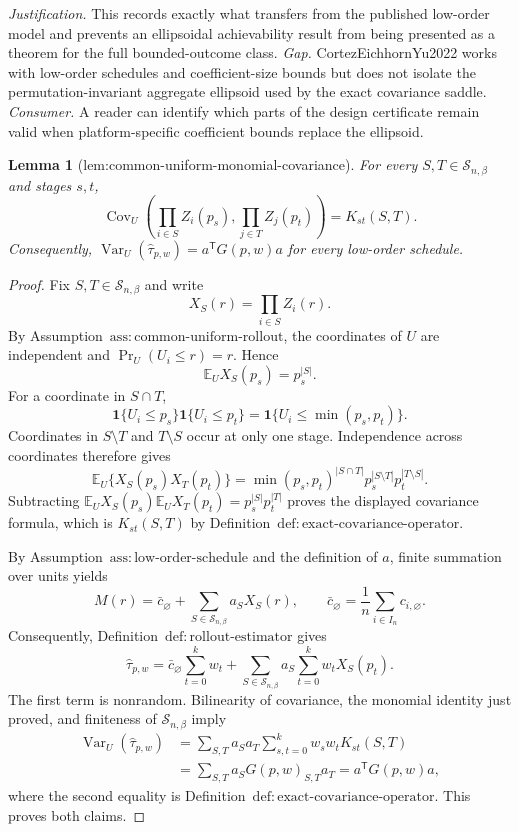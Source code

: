 \documentclass{article}
\newtheorem{lemma}{Lemma}
\begin{document}
\par\smallskip\noindent \textit{Justification.} This records exactly what transfers from the published low-order model and prevents an ellipsoidal achievability result from being presented as a theorem for the full bounded-outcome class. \textit{Gap.} CortezEichhornYu2022 works with low-order schedules and coefficient-size bounds but does not isolate the permutation-invariant aggregate ellipsoid used by the exact covariance saddle. \textit{Consumer.} A reader can identify which parts of the design certificate remain valid when platform-specific coefficient bounds replace the ellipsoid.

\begin{lemma}[lem:common-uniform-monomial-covariance]\label{lem:common-uniform-monomial-covariance}
For every \(S,T\in\mathcal S_{n,\beta}\) and stages \(s,t\), \[\operatorname{Cov}_U\!\left(\prod_{i\in S}Z_i(p_s),\prod_{j\in T}Z_j(p_t)\right)=K_{st}(S,T).\] Consequently, \(\operatorname{Var}_U(\widehat\tau_{p,w})=a^{\mathsf T}G(p,w)a\) for every low-order schedule.
\end{lemma}
\begin{proof}
Fix \(S,T\in\mathcal S_{n,\beta}\) and write
\[
X_S(r)=\prod_{i\in S}Z_i(r).
\]
By Assumption~\(\mathrm{ass{:}common\text{-}uniform\text{-}rollout}\), the coordinates of \(U\) are independent and \(\Pr_U(U_i\le r)=r\).  Hence
\[
\mathbb E_U X_S(p_s)=p_s^{|S|}.
\]
For a coordinate in \(S\cap T\),
\[
\mathbf 1\{U_i\le p_s\}\mathbf 1\{U_i\le p_t\}
=\mathbf 1\{U_i\le\min(p_s,p_t)\}.
\]
Coordinates in \(S\setminus T\) and \(T\setminus S\) occur at only one stage.  Independence across coordinates therefore gives
\[
\mathbb E_U\{X_S(p_s)X_T(p_t)\}
=\min(p_s,p_t)^{|S\cap T|}p_s^{|S\setminus T|}p_t^{|T\setminus S|}.
\]
Subtracting \(\mathbb E_U X_S(p_s)\mathbb E_U X_T(p_t)=p_s^{|S|}p_t^{|T|}\) proves the displayed covariance formula, which is \(K_{st}(S,T)\) by Definition~\(\mathrm{def{:}exact\text{-}covariance\text{-}operator}\).

By Assumption~\(\mathrm{ass{:}low\text{-}order\text{-}schedule}\) and the definition of \(a\), finite summation over units yields
\[
M(r)=\bar c_{\varnothing}+\sum_{S\in\mathcal S_{n,\beta}}a_SX_S(r),
\qquad
\bar c_{\varnothing}=\frac1n\sum_{i\in I_n}c_{i,\varnothing}.
\]
Consequently, Definition~\(\mathrm{def{:}rollout\text{-}estimator}\) gives
\[
\widehat\tau_{p,w}
=\bar c_{\varnothing}\sum_{t=0}^kw_t
+\sum_{S\in\mathcal S_{n,\beta}}a_S\sum_{t=0}^kw_tX_S(p_t).
\]
The first term is nonrandom.  Bilinearity of covariance, the monomial identity just proved, and finiteness of \(\mathcal S_{n,\beta}\) imply
\[
\begin{aligned}
\operatorname{Var}_U(\widehat\tau_{p,w})
&=\sum_{S,T}a_Sa_T\sum_{s,t=0}^kw_sw_tK_{st}(S,T)\\
&=\sum_{S,T}a_SG(p,w)_{S,T}a_T
=a^{\mathsf T}G(p,w)a,
\end{aligned}
\]
where the second equality is Definition~\(\mathrm{def{:}exact\text{-}covariance\text{-}operator}\).  This proves both claims.
\end{proof}
\end{document}
